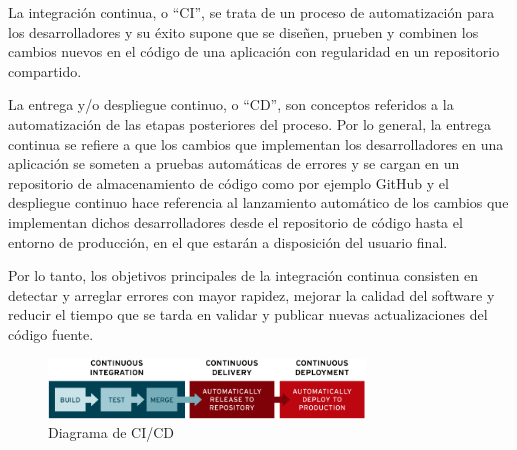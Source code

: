 La integración continua, o ``CI'', se trata de un proceso de automatización para los desarrolladores y su éxito supone que se diseñen, prueben y combinen los cambios nuevos en el código de una aplicación con regularidad en un repositorio compartido.

La entrega y/o despliegue continuo, o ``CD'', son conceptos referidos a la automatización de las etapas posteriores del proceso. Por lo general, la entrega continua se refiere a que los cambios que implementan los desarrolladores en una aplicación se someten a pruebas automáticas de errores y se cargan en un repositorio de almacenamiento de código como por ejemplo GitHub y el despliegue continuo hace referencia al lanzamiento automático de los cambios que implementan dichos desarrolladores desde el repositorio de código hasta el entorno de producción, en el que estarán a disposición del usuario final.



Por lo tanto, los objetivos principales de la integración continua consisten en detectar y arreglar errores con mayor rapidez, mejorar la calidad del software y reducir el tiempo que se tarda en validar y publicar nuevas actualizaciones del código fuente.

\begin{figure}[h]
    \centering
    \includegraphics[width=0.75\textwidth,clip=true]{imgs/ci-cd-flow-desktop.png}
    \caption{Diagrama de CI/CD}
\end{figure}

